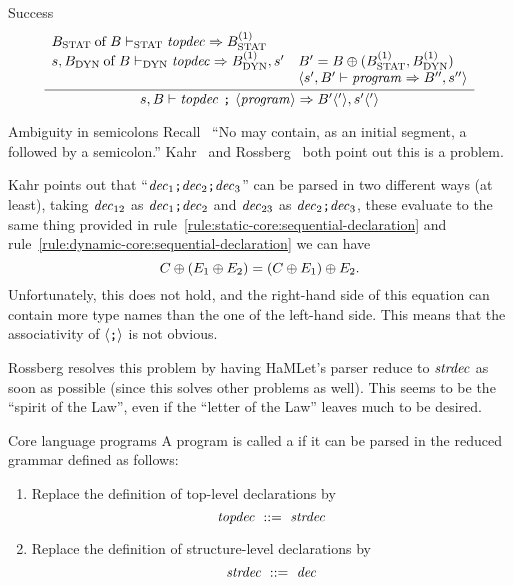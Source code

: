 \begin{inference-rule}{Success}
\begin{equation}\label{rule:programs:success}
\vcenter{\infer{\s,\B\ts\longprog\ra\B'\optional{'},\s'\optional{'}}
  {\begin{array}{ll}
    \of{\Bstat}{\B}\tsstat\topdec\ra\Bstat^{(1)} & \\
    \s,\of{\Bdyn}{\B}\tsdyn\topdec\ra\Bdyn^{(1)},s'&
                \B'=\B\oplus(\Bstat^{(1)},\Bdyn^{(1)})\\
    &           \optional{\s',\B'\ts\program\ra\B'',s''}
   \end{array}}}
\end{equation}
\end{inference-rule}

\begin{remark}{Ambiguity in semicolons}
Recall~ ``No  may contain, as an initial segment, a
 followed by a semicolon.'' Kahr~\cite[]{kahrs1993mistakes}
and Rossberg~\cite{rossberg2018defects} both point out this is a problem.

Kahr points out that ``$\textit{dec\/}_{1}\texttt{;}\textit{dec\/}_{2}\texttt{;}\textit{dec\/}_{3}$''
can be parsed in two different ways (at least), taking $\textit{dec\/}_{12}$ as $\textit{dec\/}_{1}\texttt{;}\textit{dec\/}_{2}$
and $\textit{dec\/}_{23}$ as $\textit{dec\/}_{2}\texttt{;}\textit{dec\/}_{3}$, these evaluate to the
same thing provided in rule~\ref{rule:static-core:sequential-declaration}
and rule~\ref{rule:dynamic-core:sequential-declaration} we can have
\begin{equation*}
C\oplus(E_{1}\oplus E_{2})=(C\oplus E_{1})\oplus E_{2}.
\end{equation*}
Unfortunately, this does not hold, and the right-hand side of this
equation can contain more type names than the one of the left-hand side.
This means that the associativity of $\langle\texttt{;}\rangle$ is not obvious.

Rossberg resolves this problem by having HaMLet's parser reduce to
$\textit{strdec\/}$ as soon as possible (since this solves other problems as
well). This seems to be the ``spirit of the Law'', even if the ``letter
of the Law'' leaves much to be desired.
\end{remark}

\begin{definition}{Core language programs}
A program is called a  if it can be parsed
in the reduced grammar defined as follows:
\begin{enumerate}
\item Replace the definition of top-level declarations by
\begin{equation*}
\textit{topdec\/}\ ::=\ \textit{strdec\/}
\end{equation*}
\item Replace the definition of structure-level declarations by
\begin{equation*}
\textit{strdec\/}\ ::=\ \textit{dec\/}
\end{equation*}
\end{enumerate}
\end{definition}


